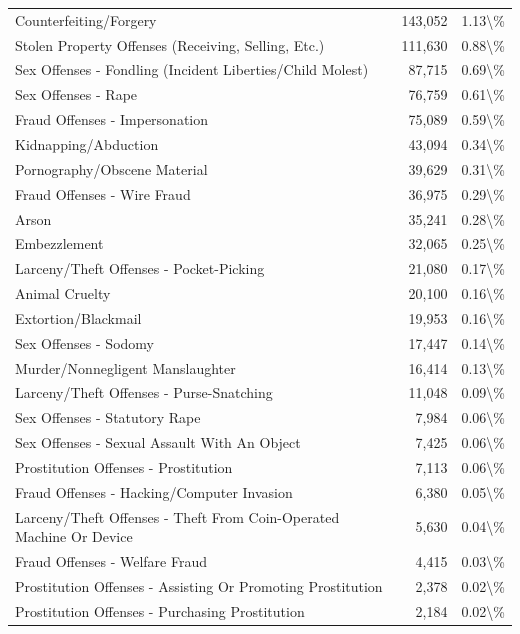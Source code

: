 \documentclass[
  12pt,
  openany]{book}
\begin{document}
\begin{longtable}[t]{lrr}
Counterfeiting/Forgery & 143,052 & 1.13\textbackslash{}\%\\
Stolen Property Offenses (Receiving, Selling, Etc.) & 111,630 & 0.88\textbackslash{}\%\\
\addlinespace
Sex Offenses - Fondling (Incident Liberties/Child Molest) & 87,715 & 0.69\textbackslash{}\%\\
Sex Offenses - Rape & 76,759 & 0.61\textbackslash{}\%\\
Fraud Offenses - Impersonation & 75,089 & 0.59\textbackslash{}\%\\
Kidnapping/Abduction & 43,094 & 0.34\textbackslash{}\%\\
Pornography/Obscene Material & 39,629 & 0.31\textbackslash{}\%\\
\addlinespace
Fraud Offenses - Wire Fraud & 36,975 & 0.29\textbackslash{}\%\\
Arson & 35,241 & 0.28\textbackslash{}\%\\
Embezzlement & 32,065 & 0.25\textbackslash{}\%\\
Larceny/Theft Offenses - Pocket-Picking & 21,080 & 0.17\textbackslash{}\%\\
Animal Cruelty & 20,100 & 0.16\textbackslash{}\%\\
\addlinespace
Extortion/Blackmail & 19,953 & 0.16\textbackslash{}\%\\
Sex Offenses - Sodomy & 17,447 & 0.14\textbackslash{}\%\\
Murder/Nonnegligent Manslaughter & 16,414 & 0.13\textbackslash{}\%\\
Larceny/Theft Offenses - Purse-Snatching & 11,048 & 0.09\textbackslash{}\%\\
Sex Offenses - Statutory Rape & 7,984 & 0.06\textbackslash{}\%\\
\addlinespace
Sex Offenses - Sexual Assault With An Object & 7,425 & 0.06\textbackslash{}\%\\
Prostitution Offenses - Prostitution & 7,113 & 0.06\textbackslash{}\%\\
Fraud Offenses - Hacking/Computer Invasion & 6,380 & 0.05\textbackslash{}\%\\
Larceny/Theft Offenses - Theft From Coin-Operated Machine Or Device & 5,630 & 0.04\textbackslash{}\%\\
Fraud Offenses - Welfare Fraud & 4,415 & 0.03\textbackslash{}\%\\
\addlinespace
Prostitution Offenses - Assisting Or Promoting Prostitution & 2,378 & 0.02\textbackslash{}\%\\
Prostitution Offenses - Purchasing Prostitution & 2,184 & 0.02\textbackslash{}\%\\

\end{longtable}
\end{document}
